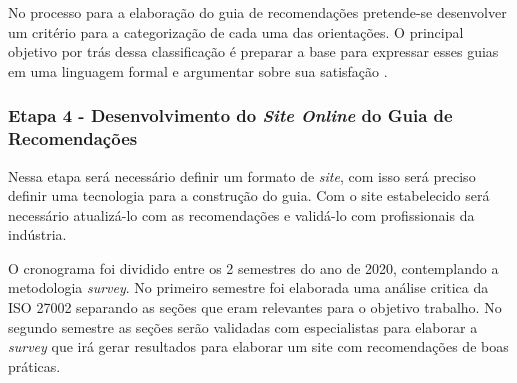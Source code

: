 No processo para a elaboração do guia de recomendações pretende-se desenvolver um critério para a categorização de cada uma das orientações. O principal objetivo por trás dessa classificação é preparar a base para expressar esses guias em uma linguagem formal e argumentar sobre sua satisfação \cite{zhioua2016security}.

\subsubsection{\textbf{Etapa 4 - Desenvolvimento do \textit{Site Online} do Guia de Recomendações}}
Nessa etapa será necessário definir um formato de \textit{site}, com isso será preciso definir uma tecnologia para a construção do guia. Com o site estabelecido será necessário atualizá-lo com as recomendações e validá-lo com profissionais da indústria.

O cronograma foi dividido entre os 2 semestres do ano de 2020, contemplando
a metodologia \textit{survey}. No primeiro semestre foi elaborada uma análise critica da ISO
27002 separando as seções que eram relevantes para o objetivo trabalho. No segundo
semestre as seções serão validadas com especialistas para elaborar a \textit{survey} que irá gerar
resultados para elaborar um site com recomendações de boas práticas.

